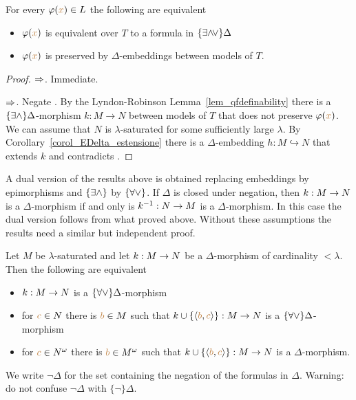 \begin{theorem}\label{thm_embeddings_preservation_E}
For every $\varphi({\color{brown} x})\in L$ the following are equivalent
\begin{itemize}
\item[1.] $\varphi({\color{brown} x})$ is equivalent over $T$ to a formula in $\{\exists{\wedge}{\!\vee}\}\Delta$
\item[2.] $\varphi({\color{brown} x})$ is preserved by $\Delta$-embeddings between models of $T$.
\end{itemize}
\end{theorem}
\begin{proof}
$\Rightarrow$. Immediate.

$\Rightarrow$. Negate .
By the Lyndon-Robinson Lemma~\ref{lem_qfdefinability} there is a $\{\exists\wedge\}\Delta$-morphism $k:M\to N$ between models of $T$ that does not preserve $\varphi({\color{brown} x})$.
We can assume that $N$ is $\lambda$-saturated for some sufficiently large $\lambda$.
By Corollary~\ref{corol_EDelta_estensione} there is a $\Delta$-embedding $h:M\hookrightarrow N$ that extends $k$ and contradicts .
\end{proof}

A dual version of the results above is obtained replacing embeddings by epimorphisms and $\{\exists\wedge\}$ by $\{\forall\vee\}$.
If $\Delta$ is closed under negation, then $k:M\rightarrow N$ is a $\Delta$-morphism if and only is $k^{-1}:N\rightarrow M$ is a $\Delta$-morphism.
In this case the dual version follows from what proved above.
Without these assumptions the results need a similar but independent proof.

\begin{proposition}\label{prop_ADelta_estensione}
Let $M$ be $\lambda$-saturated and let $k:M\rightarrow N$ be a $\Delta$-morphism of cardinality $<\lambda$.
Then the following are equivalent
\begin{itemize}
\item[1.] $k:M\rightarrow N$ is a $\{\forall\vee\}\Delta$-morphism
\item[2.] for ${\color{brown} c}\in N$ there is ${\color{brown} b}\in M$ such that $k\cup\{\langle{\color{brown}b},{\color{brown} c}\rangle\}:M\rightarrow N$ is a $\{\forall\vee\}\Delta$-morphism
\item[3.] for ${\color{brown} c}\in N^\omega$ there is ${\color{brown} b}\in M^\omega$ such that $k\cup\{\langle{\color{brown}b},{\color{brown} c}\rangle\}:M\rightarrow N$ is a $\Delta$-morphism.
\end{itemize}
\end{proposition}

We write \emph{$\neg\Delta$} for the set containing the negation of the formulas in $\Delta$.
Warning: do not confuse $\neg\Delta$ with $\{\neg\}\Delta$.

